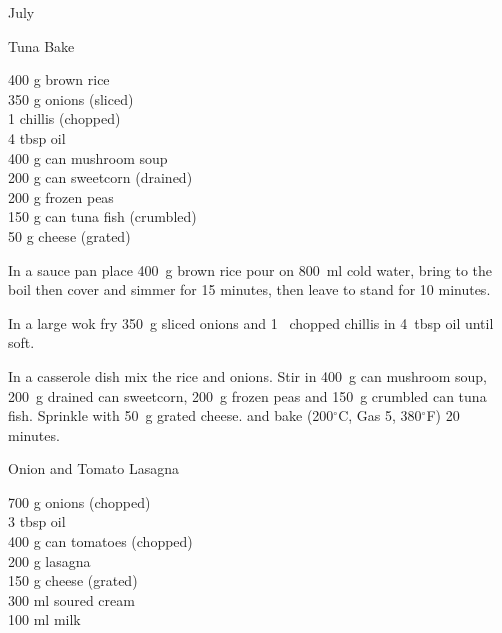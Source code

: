 \begin{menu}{July}
    \begin{recipe}{2}{Tuna Bake}%
		\begin{ingredients}
		400 g brown rice  \\
	350 g onions (sliced) \\
	1  chillis (chopped) \\
	4 tbsp oil  \\
	400 g can mushroom soup  \\
	200 g can sweetcorn (drained) \\
	200 g frozen peas  \\
	150 g can tuna fish (crumbled) \\
	50 g cheese (grated) \\
	
		\end{ingredients}
	
    \begin{instructions}
    \item 
      In a
      sauce pan
      place
      400~g  brown rice
      pour on
      800~ml  cold water,
      bring to the boil then cover and simmer for 15 minutes,
      then leave to stand for 10 minutes.
    \item 
        In a large wok fry
        350~g sliced onions
        and
        1~ chopped chillis
        in
        4~tbsp  oil
        until soft.
      \item 
        In a casserole dish mix
        the rice and onions.
        Stir in
        400~g  can mushroom soup,
        200~g drained can sweetcorn,
        200~g  frozen peas
        and
        150~g crumbled can tuna fish.
        Sprinkle with
        50~g grated cheese.
        and
        bake (200$^{\circ}$C, Gas 5, 380$^{\circ}$F) 20 minutes.
      
    \end{instructions}
    \end{recipe}%
  
    \begin{recipe}{2}{Onion and Tomato Lasagna}%
		\begin{ingredients}
		700 g onions (chopped) \\
	3 tbsp oil  \\
	400 g can tomatoes (chopped) \\
	200 g lasagna  \\
	150 g cheese (grated) \\
	300 ml soured cream  \\
	100 ml milk  \\
	

\end{ingredients}
\end{recipe}
\end{menu}
